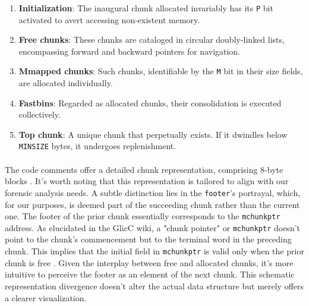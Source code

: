        \begin{enumerate}
            \item \textbf{Initialization}: The inaugural \gls{chunk} allocated invariably has its \texttt{P} bit activated to avert accessing non-existent memory.
            
            \item \textbf{Free \glspl{chunk}}: These \glspl{chunk} are cataloged in circular doubly-linked lists, encompassing forward and backward pointers for navigation.
            
            \item \textbf{Mmapped \glspl{chunk}}: Such \glspl{chunk}, identifiable by the \texttt{M} bit in their size fields, are allocated individually.
            
            \item \textbf{Fastbins}: Regarded as allocated \glspl{chunk}, their consolidation is executed collectively.
            
            \item \textbf{Top \gls{chunk}}: A unique \gls{chunk} that perpetually exists. If it dwindles below \texttt{MINSIZE} bytes, it undergoes replenishment.
        \end{enumerate}
        
        \paragraph{}The code comments offer a detailed \gls{chunk} representation, comprising 8-byte blocks \cite{gloger_malloc_2001}. It's worth noting that this representation is tailored to align with our forensic analysis needs. A subtle distinction lies in the \texttt{footer}'s portrayal, which, for our purposes, is deemed part of the succeeding \gls{chunk} rather than the current one. The footer of the prior \gls{chunk} essentially corresponds to the \texttt{mchunkptr} address. As elucidated in the GlicC wiki, a "chunk pointer" or \texttt{mchunkptr} doesn't point to the chunk's commencement but to the terminal word in the preceding \gls{chunk}. This implies that the initial field in \texttt{mchunkptr} is valid only when the prior \gls{chunk} is free \cite{delorie_malloc_2023}. Given the interplay between free and allocated \glspl{chunk}, it's more intuitive to perceive the footer as an element of the next \gls{chunk}. This schematic representation divergence doesn't alter the actual data structure but merely offers a clearer visualization.
        

